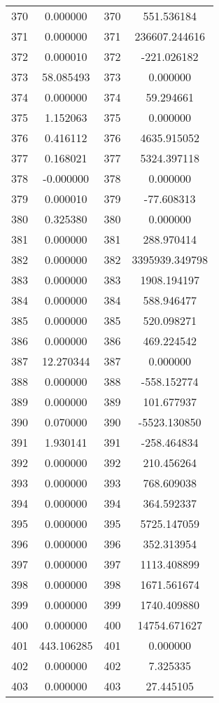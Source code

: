 \documentclass[12pt]{article}
\begin{document}
\begin{longtable}{@{}cccc@{}}
370 & 0.000000 & 370 & 551.536184 \\
371 & 0.000000 & 371 & 236607.244616 \\
372 & 0.000010 & 372 & -221.026182 \\
373 & 58.085493 & 373 & 0.000000 \\
374 & 0.000000 & 374 & 59.294661 \\
375 & 1.152063 & 375 & 0.000000 \\
376 & 0.416112 & 376 & 4635.915052 \\
377 & 0.168021 & 377 & 5324.397118 \\
378 & -0.000000 & 378 & 0.000000 \\
379 & 0.000010 & 379 & -77.608313 \\
380 & 0.325380 & 380 & 0.000000 \\
381 & 0.000000 & 381 & 288.970414 \\
382 & 0.000000 & 382 & 3395939.349798 \\
383 & 0.000000 & 383 & 1908.194197 \\
384 & 0.000000 & 384 & 588.946477 \\
385 & 0.000000 & 385 & 520.098271 \\
386 & 0.000000 & 386 & 469.224542 \\
387 & 12.270344 & 387 & 0.000000 \\
388 & 0.000000 & 388 & -558.152774 \\
389 & 0.000000 & 389 & 101.677937 \\
390 & 0.070000 & 390 & -5523.130850 \\
391 & 1.930141 & 391 & -258.464834 \\
392 & 0.000000 & 392 & 210.456264 \\
393 & 0.000000 & 393 & 768.609038 \\
394 & 0.000000 & 394 & 364.592337 \\
395 & 0.000000 & 395 & 5725.147059 \\
396 & 0.000000 & 396 & 352.313954 \\
397 & 0.000000 & 397 & 1113.408899 \\
398 & 0.000000 & 398 & 1671.561674 \\
399 & 0.000000 & 399 & 1740.409880 \\
400 & 0.000000 & 400 & 14754.671627 \\
401 & 443.106285 & 401 & 0.000000 \\
402 & 0.000000 & 402 & 7.325335 \\
403 & 0.000000 & 403 & 27.445105 \\

\end{longtable}
\end{document}
